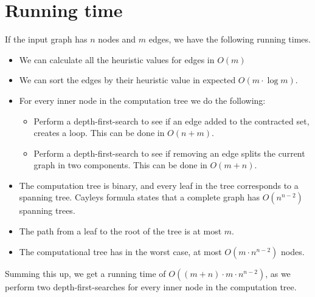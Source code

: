 
\section{Running time}
If the input graph has $n$ nodes and $m$ edges, we have the following running times.

\begin{itemize}
\item We can calculate all the heuristic values for edges in $O(m)$

\item We can sort the edges by their heuristic value in expected $O(m\cdot \log m)$.

\item For every inner node in the computation tree we do the following:
\begin{itemize}
\item Perform a depth-first-search to see if an edge added to the contracted set, creates a loop. This can be done in $O(n+m)$.

\item Perform a depth-first-search to see if removing an edge splits the current graph in two components. This can be done in $O(m+n)$.
\end{itemize}

\item The computation tree is binary, and every leaf in the tree corresponds to a spanning tree. Cayleys formula states that a complete graph has $O(n^{n-2})$ spanning trees.

\item The path from a leaf to the root of the tree is at most $m$.

\item The computational tree has in the worst case, at most $O(m\cdot n^{n-2})$ nodes.
\end{itemize}

Summing this up, we get a running time of $O((m+n)\cdot m\cdot n^{n-2})$, as we perform two depth-first-searches for every inner node in the computation tree.